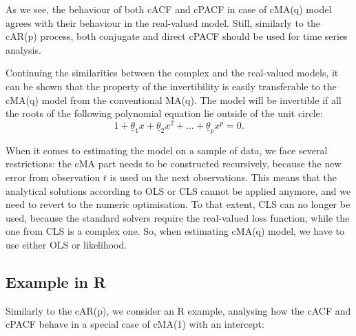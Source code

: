 \documentclass[
]{book}
\begin{document}
As we see, the behaviour of both cACF and cPACF in case of cMA(q) model agrees with their behaviour in the real-valued model. Still, similarly to the cAR(p) process, both conjugate and direct cPACF should be used for time series analysis.

Continuing the similarities between the complex and the real-valued models, it can be shown that the property of the invertibility is easily transferable to the cMA(q) model from the conventional MA(q). The model will be invertible if all the roots of the following polynomial equation lie outside of the unit circle:
\begin{equation}
    1 + \underline{\theta}_1 x + \underline{\theta}_2 x^2 + \dots + \underline{\theta}_p x^p = 0 .
    \label{eq:ComplexMAPolyRoots}
\end{equation}

When it comes to estimating the model on a sample of data, we face several restrictions: the cMA part needs to be constructed recursively, because the new error from observation \(t\) is used on the next observations. This means that the analytical solutions according to OLS or CLS cannot be applied anymore, and we need to revert to the numeric optimisation. To that extent, CLS can no longer be used, because the standard solvers require the real-valued loss function, while the one from CLS is a complex one. So, when estimating cMA(q) model, we have to use either OLS or likelihood.

\hypertarget{example-in-r-2}{%
\subsection{Example in R}\label{example-in-r-2}}

Similarly to the cAR(p), we consider an R example, analysing how the cACF and cPACF behave in a special case of cMA(1) with an intercept:
\end{document}
